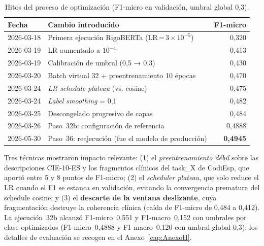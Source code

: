 \begin{table}[h]
\centering
\caption{Hitos del proceso de optimización (F1-micro en validación, umbral global 0,3).}
\label{tab:hitos}
\begin{tabular}{llr}
\hline
\textbf{Fecha} & \textbf{Cambio introducido} & \textbf{F1-micro} \\
\hline
2026-03-18 & Primera ejecución RigoBERTa (LR\,=\,$3\times10^{-5}$) & 0,320 \\
2026-03-19 & LR aumentado a $10^{-4}$ & 0,413 \\
2026-03-19 & Calibración de umbral (0,5 → 0,3) & 0,430 \\
2026-03-20 & Batch virtual 32 + preentrenamiento 10 épocas & 0,470 \\
2026-03-24 & \emph{LR schedule plateau} (vs. cosine) & 0,475 \\
2026-03-24 & \emph{Label smoothing} = 0,1 & 0,482 \\
2026-03-25 & Descongelado progresivo de capas & 0,484 \\
2026-03-26 & Paso~32b: configuración de referencia & 0,4888 \\
2026-05-30 & Paso~36: reejecución (fue el modelo de producción) & \textbf{0,4945} \\
\hline
\end{tabular}
\end{table}

Tres técnicas mostraron impacto relevante: (1) el \emph{preentrenamiento débil} sobre las descripciones CIE-10-ES y los fragmentos clínicos del task\_X de CodiEsp, que aportó entre 5 y 8 puntos de F1-micro; (2) el \emph{scheduler plateau}, que solo reduce el LR cuando el F1 se estanca en validación, evitando la convergencia prematura del schedule cosine; y (3) el \textbf{descarte de la ventana deslizante}, cuya fragmentación destruye la coherencia clínica (caída de F1-micro de 0,484 a 0,412). La ejecución~32b alcanzó F1-micro~0,551 y F1-macro~0,152 con umbrales por clase optimizados (F1-micro~0,4888 y F1-macro~0,120 con umbral global 0,3); los detalles de evaluación se recogen en el Anexo~\ref{cap:AnexoH}.

